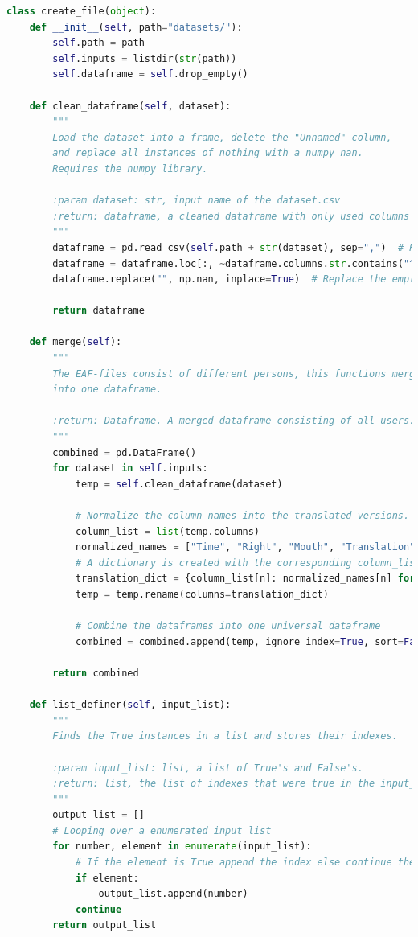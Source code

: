  \label{apx:first}
\begin{lstlisting}[language=Python, caption=Shown is the Python code to merge the multiple CSV-files into one DataFrame.]
class create_file(object):
    def __init__(self, path="datasets/"):
        self.path = path
        self.inputs = listdir(str(path))
        self.dataframe = self.drop_empty()

    def clean_dataframe(self, dataset):
        """
        Load the dataset into a frame, delete the "Unnamed" column,
        and replace all instances of nothing with a numpy nan.
        Requires the numpy library.

        :param dataset: str, input name of the dataset.csv
        :return: dataframe, a cleaned dataframe with only used columns
        """
        dataframe = pd.read_csv(self.path + str(dataset), sep=",")  # Read into a frame
        dataframe = dataframe.loc[:, ~dataframe.columns.str.contains("^Unnamed")]  # Drop the "^Unnamed" column
        dataframe.replace("", np.nan, inplace=True)  # Replace the empty values with a nan

        return dataframe

    def merge(self):
        """
        The EAF-files consist of different persons, this functions merges those
        into one dataframe.

        :return: Dataframe. A merged dataframe consisting of all users.
        """
        combined = pd.DataFrame()
        for dataset in self.inputs:
            temp = self.clean_dataframe(dataset)

            # Normalize the column names into the translated versions.
            column_list = list(temp.columns)
            normalized_names = ["Time", "Right", "Mouth", "Translation", "Left"]
            # A dictionary is created with the corresponding column_list name and the normalized name
            translation_dict = {column_list[n]: normalized_names[n] for n in range(len(normalized_names))}
            temp = temp.rename(columns=translation_dict)

            # Combine the dataframes into one universal dataframe
            combined = combined.append(temp, ignore_index=True, sort=False)

        return combined

    def list_definer(self, input_list):
        """
        Finds the True instances in a list and stores their indexes.

        :param input_list: list, a list of True's and False's.
        :return: list, the list of indexes that were true in the input_list.
        """
        output_list = []
        # Looping over a enumerated input_list
        for number, element in enumerate(input_list):
            # If the element is True append the index else continue the loop
            if element:
                output_list.append(number)
            continue
        return output_list


\end{lstlisting}

